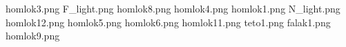 homlok3.png
F_light.png
homlok8.png
homlok4.png
homlok1.png
N_light.png
homlok12.png
homlok5.png
homlok6.png
homlok11.png
teto1.png
falak1.png
homlok9.png
